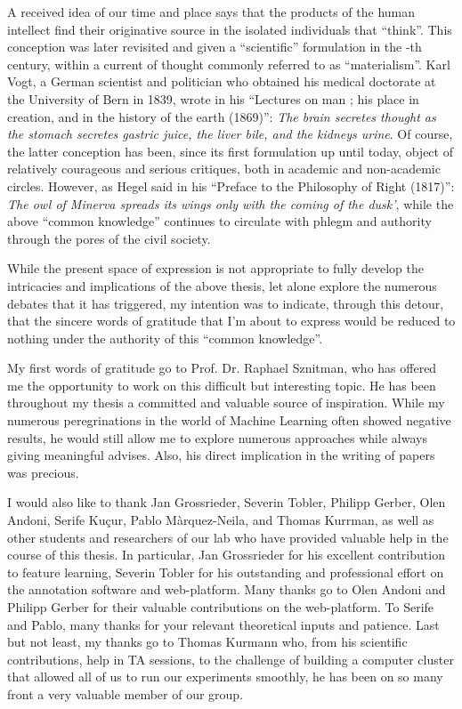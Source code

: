 \begin{acknowledgements}
\addchaptertocentry{\acknowledgementname} %
A received idea of our time and place says that the products of the human intellect find their originative source in the isolated individuals that ``think''.
This conception was later revisited and given a ``scientific'' formulation in the -th century, within a current of thought commonly referred to as ``materialism''.
Karl Vogt, a German scientist and politician who obtained his medical doctorate at the University of Bern in 1839, wrote in his ``Lectures on man ; his place in creation, and in the history of the earth (1869)'':
\textit{The brain secretes thought as the stomach secretes gastric juice, the liver bile, and the kidneys urine}.
Of course, the latter conception has been, since its first formulation up until today, object of relatively courageous and serious critiques, both in academic and non-academic circles.
However, as Hegel said in his ``Preface to the Philosophy of Right (1817)'': \textit{The owl of Minerva spreads its wings only with the coming of the dusk’}, while the above ``common knowledge'' continues to circulate with phlegm and authority through the pores of the civil society.

While the present space of expression is not appropriate to fully develop the intricacies and implications of the above thesis, let alone explore the numerous debates that it has triggered, my intention was to indicate, through this detour, that the sincere words of gratitude that I'm about to express would be reduced to nothing under the authority of this ``common knowledge''.

\bigskip
My first words of gratitude go to Prof. Dr. Raphael Sznitman, who has offered me the opportunity to work on this difficult but interesting topic.
He has been throughout my thesis a committed and valuable source of inspiration.
While my numerous peregrinations in the world of Machine Learning often showed negative results, he would still allow me to explore numerous approaches while always giving meaningful advises.
Also, his direct implication in the writing of papers was precious.

\bigskip
I would also like to thank Jan Grossrieder, Severin Tobler, Philipp Gerber, Olen Andoni, Serife Kuçur, Pablo Màrquez-Neila, and Thomas Kurrman, as well as other students and researchers of our lab who have provided valuable help in the course of this thesis.
In particular, Jan Grossrieder for his excellent contribution to feature learning, Severin Tobler for his outstanding and professional effort on the annotation software and web-platform.
Many thanks go to Olen Andoni and Philipp Gerber for their valuable contributions on the web-platform.
To Serife and Pablo, many thanks for your relevant theoretical inputs and patience.
Last but not least, my thanks go to Thomas Kurmann who, from his scientific contributions, help in TA sessions, to the challenge of building a computer cluster that allowed all of us to run our experiments smoothly, he has been on so many front a very valuable member of our group.


\end{acknowledgements}
